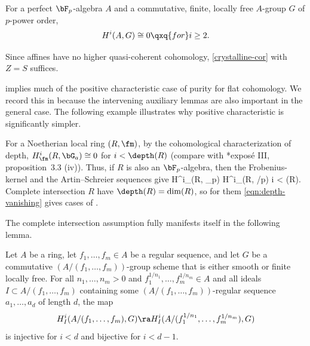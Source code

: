 \bcor \label{cor:perfect-vanish}
For a perfect $\bF_p$-algebra $A$ and a commutative, finite, locally free $A$-group $G$ of $p$-power order,
\[
H^i(A, G) \cong 0 \qxq{for} i \ge 2.
\]
\ecor

\bpf
Since affines have no higher quasi-coherent cohomology, \eqref{crystalline-cor} with $Z = S$ suffices. %
\epf




 implies much of the positive characteristic case of purity for flat cohomology. We record this in  because the intervening auxiliary lemmas are also important in the general case. The following example illustrates why positive characteristic is significantly simpler.



\beg \label{eg:depth-example}
For a Noetherian local ring $(R, \fm)$, by the cohomological characterization of depth, $H^i_\fm(R, \bG_a) \cong 0$ for $i < \depth(R)$ (compare with \cite{SGA2new}*{expos\'{e} III, proposition~3.3 (iv)}). Thus, if $R$ is also an $\bF_p$-algebra, then the Frobenius-kernel and the Artin--Schreier sequences give %
\be \label{eqn:depth-vanishing}
H^i_\fm(R, \gA_p)   H^i_\fm(R, \bZ/p\bZ)  \q {} \q i < \depth(R).
\ee
Complete intersection $R$ have $\depth(R) = \dim(R)$, so for them \eqref{eqn:depth-vanishing} gives cases of .
\eeg


The complete intersection assumption fully manifests itself in the following lemma.

\blem \label{mod-out-by-more}
Let $A$ be a ring, let $f_1, \dotsc, f_m \in A$ be a regular sequence, and let $G$ be a commutative $(A/(f_1, \dotsc, f_m))$-group scheme that is either smooth or finite locally free. For all $n_1, \dotsc, n_m > 0$ and $f_1^{1/n_1}, \dotsc, f_m^{1/n_m} \in A$ and all ideals $I \subset A/(f_1, \dotsc, f_m)$ containing some $(A/(f_1, \dotsc, f_m))$-regular sequence $a_1, \dotsc, a_d$ of length $d$, the map
\[
H^i_I(A/(f_1, \dotsc, f_m), G) \ra H^i_I(A/(f_1^{1/n_1}, \dotsc, f_m^{1/n_m}), G)
\]  %
is injective for $i < d$ and bijective for $i < d - 1$.
\elem


